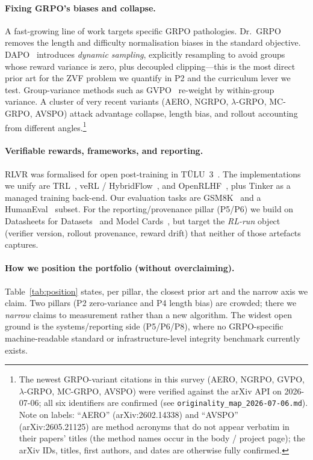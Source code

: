 \documentclass[11pt,a4paper]{article}
\begin{document}
\paragraph{Fixing GRPO's biases and collapse.}
A fast-growing line of work targets specific GRPO pathologies. Dr.\
GRPO~\cite{liu2025drgrpo} removes the length and difficulty normalisation biases
in the standard objective. DAPO~\cite{yu2025dapo} introduces \emph{dynamic
sampling}, explicitly resampling to avoid groups whose reward variance is zero,
plus decoupled clipping---this is the most direct prior art for the ZVF problem
we quantify in P2 and the curriculum lever we test. Group-variance methods such
as GVPO~\cite{gvpo2025} re-weight by within-group variance. A cluster of very
recent variants (AERO, NGRPO, $\lambda$-GRPO, MC-GRPO, AVSPO) attack advantage
collapse, length bias, and rollout accounting from different angles.\footnote{The
newest GRPO-variant citations in this survey (AERO, NGRPO, GVPO, $\lambda$-GRPO,
MC-GRPO, AVSPO) were verified against the arXiv API on 2026-07-06; all six
identifiers are confirmed (see \texttt{originality\_map\_2026-07-06.md}). Note on
labels: ``AERO'' (arXiv:2602.14338) and ``AVSPO'' (arXiv:2605.21125) are method
acronyms that do not appear verbatim in their papers' titles (the method names
occur in the body / project page); the arXiv IDs, titles, first authors, and dates
are otherwise fully confirmed.}

\paragraph{Verifiable rewards, frameworks, and reporting.}
RLVR was formalised for open post-training in TÜLU~3~\cite{lambert2024tulu3}. The
implementations we unify are TRL~\cite{vonwerra2020trl}, veRL /
HybridFlow~\cite{sheng2024hybridflow}, and OpenRLHF~\cite{hu2024openrlhf}, plus
Tinker as a managed training back-end. Our evaluation tasks are
GSM8K~\cite{cobbe2021gsm8k} and a HumanEval~\cite{chen2021humaneval} subset. For
the reporting/provenance pillar (P5/P6) we build on Datasheets for
Datasets~\cite{gebru2021datasheets} and Model Cards~\cite{mitchell2019modelcards},
but target the \emph{RL-run} object (verifier version, rollout provenance, reward
drift) that neither of those artefacts captures.

\paragraph{How we position the portfolio (without overclaiming).}
Table~\ref{tab:position} states, per pillar, the closest prior art and the
narrow axis we claim. Two pillars (P2 zero-variance and P4 length bias) are
crowded; there we \emph{narrow} claims to measurement rather than a new
algorithm. The widest open ground is the systems/reporting side (P5/P6/P8),
where no GRPO-specific machine-readable standard or infrastructure-level
integrity benchmark currently exists.
\end{document}
